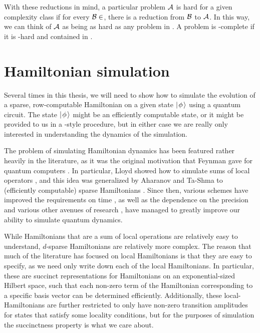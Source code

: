 \documentclass[../thesis-main/thesis-main]{subfiles}
\begin{document}
With these reductions in mind, a particular problem $\mathcal{A}$ is hard for a given complexity class  if for every $\mathcal{B}\in$, there is a reduction from $\mathcal{B}$ to $\mathcal{A}$.  In this way, we can think of $\mathcal{A}$ as being as hard as any problem in .  A problem is -complete if it is -hard and contained in .


\section{Hamiltonian simulation}\label{sec:hamiltonian_simulation}

Several times in this thesis, we will need to show how to simulate the evolution of a sparse, row-computable Hamiltonian on a given state $|\mspace{2mu} \phi \mspace{2mu} \rangle$ using a quantum circuit.  The state $|\mspace{2mu} \phi \mspace{2mu} \rangle$ might be an efficiently computable state, or it might be provided to us in a \QMA-style procedure, but in either case we are really only interested in understanding the dynamics of the simulation.

The problem of simulating Hamiltonian dynamics has been featured rather heavily in the literature, as it was the original motivation that Feynman gave for quantum computers \cite{Fey82,Fey85}.  In particular, Lloyd showed how to simulate sums of local operators \cite{Llo96}, and this idea was generalized by Aharanov and Ta-Shma to (efficiently computable) sparse Hamiltonians \cite{AT03}.  Since then, various schemes have improved the requirements on time \cite{BACS07,WBHS11,BC12}, as well as the dependence on the precision \cite{BCCKS14,BCCKS15} and various other avenues of research \cite{Chi09, PQSV11}, have managed to greatly improve our ability to simulate quantum dynamics.  

While Hamiltonians that are a sum of local operations are relatively easy to understand, $d$-sparse Hamiltonians are relatively more complex.  The reason that much of the literature has focused on local Hamiltonians is that they are easy to specify, as we need only write down each of the local Hamiltonians.  In particular, these are succinct representations for Hamiltonians on an exponential-sized Hilbert space, such that each non-zero term of the Hamiltonian corresponding to a specific basis vector can be determined efficiently.  Additionally, these local-Hamiltonians are further restricted to only have non-zero transition amplitudes for states that satisfy some locality conditions, but for the purposes of simulation the succinctness property is what we care about.
\end{document}
